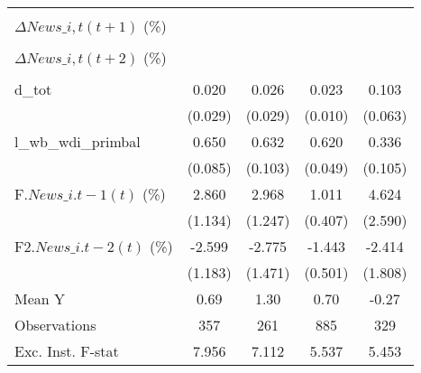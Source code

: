{\begin{tabular}{l*{4}{c}}
                    &                     &                     &                     &                     \\
\addlinespace
$ \Delta News\_{i,t}(t+1)$ (\%)&                     &                     &                     &                     \\
                    &                     &                     &                     &                     \\
\addlinespace
$ \Delta News\_{i,t}(t+2)$ (\%)&                     &                     &                     &                     \\
                    &                     &                     &                     &                     \\
\addlinespace
d\_tot               &       0.020         &       0.026         &       0.023\sym{**} &       0.103         \\
                    &     (0.029)         &     (0.029)         &     (0.010)         &     (0.063)         \\
\addlinespace
l\_wb\_wdi\_primbal    &       0.650\sym{***}&       0.632\sym{***}&       0.620\sym{***}&       0.336\sym{***}\\
                    &     (0.085)         &     (0.103)         &     (0.049)         &     (0.105)         \\
\addlinespace
F.$ News\_{i.t-1}(t)$ (\%)&       2.860\sym{**} &       2.968\sym{**} &       1.011\sym{**} &       4.624\sym{*}  \\
                    &     (1.134)         &     (1.247)         &     (0.407)         &     (2.590)         \\
\addlinespace
F2.$ News\_{i.t-2}(t)$ (\%)&      -2.599\sym{**} &      -2.775\sym{*}  &      -1.443\sym{***}&      -2.414         \\
                    &     (1.183)         &     (1.471)         &     (0.501)         &     (1.808)         \\
\midrule
Mean Y              &        0.69         &        1.30         &        0.70         &       -0.27         \\
Observations        &         357         &         261         &         885         &         329         \\
Exc. Inst. F-stat   &       7.956         &       7.112         &       5.537         &       5.453         \\
\bottomrule
\end{tabular}
}
